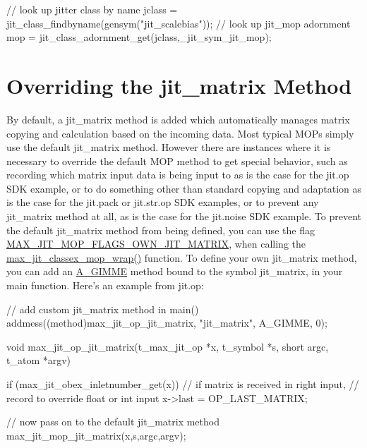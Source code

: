 \begin{DoxyCode}
   // look up jitter class by name
   jclass = jit_class_findbyname(gensym("jit_scalebias"));
   // look up jit_mop adornment 
   mop = jit_class_adornment_get(jclass,_jit_sym_jit_mop);
\end{DoxyCode}
\hypertarget{chapter_jit_mopdetails_chapter_jit_mopdetails_override}{}\section{Overriding the jit\_\-matrix Method}\label{chapter_jit_mopdetails_chapter_jit_mopdetails_override}
By default, a jit\_\-matrix method is added which automatically manages matrix copying and calculation based on the incoming data. Most typical MOPs simply use the default jit\_\-matrix method. However there are instances where it is necessary to override the default MOP method to get special behavior, such as recording which matrix input data is being input to as is the case for the jit.op SDK example, or to do something other than standard copying and adaptation as is the case for the jit.pack or jit.str.op SDK examples, or to prevent any jit\_\-matrix method at all, as is the case for the jit.noise SDK example. To prevent the default jit\_\-matrix method from being defined, you can use the flag \hyperlink{group__jitter_ga76b29cb7bf7f194cef194fb65df28ddd}{MAX\_\-JIT\_\-MOP\_\-FLAGS\_\-OWN\_\-JIT\_\-MATRIX}, when calling the \hyperlink{group__maxmopmod_ga7e08584771f58ce1fe0b190d27b5759b}{max\_\-jit\_\-classex\_\-mop\_\-wrap()} function. To define your own jit\_\-matrix method, you can add an \hyperlink{group__atom_gga8aa6700e9f00b132eb376db6e39ade47a81c1a8550f038db16a619167a70a79b6}{A\_\-GIMME} method bound to the symbol jit\_\-matrix, in your main function. Here's an example from jit.op:


\begin{DoxyCode}
   // add custom jit_matrix method in main()
   addmess((method)max_jit_op_jit_matrix, "jit_matrix", A_GIMME, 0);

   void max_jit_op_jit_matrix(t_max_jit_op *x, t_symbol *s, short argc,
               t_atom *argv)
   {
      if (max_jit_obex_inletnumber_get(x)) 
      {
         // if matrix is received in right input, 
         // record to override float or int input
         x->last = OP_LAST_MATRIX;
      }
      
      // now pass on to the default jit_matrix method 
      max_jit_mop_jit_matrix(x,s,argc,argv);
   }
\end{DoxyCode}


